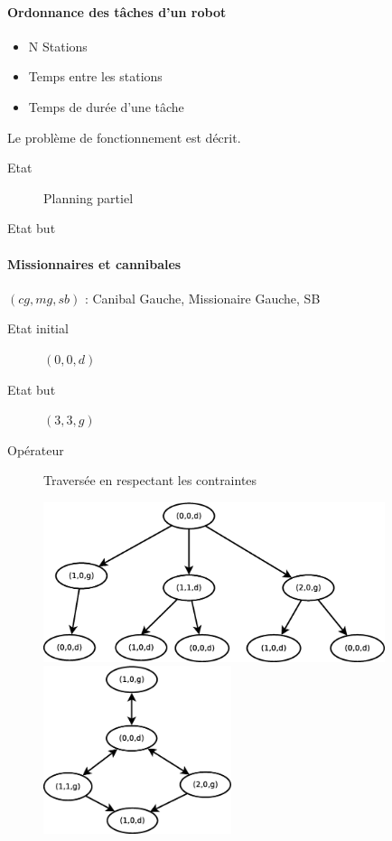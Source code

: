 \documentclass[12pt,a4paper,openany]{book}
\begin{document}
		\begin{exemple}
			\paragraph{Ordonnance des tâches d'un robot}
\begin{itemize}
	\item N Stations
	\item Temps entre les stations
	\item Temps de durée d'une tâche
\end{itemize}
Le problème de fonctionnement est décrit.

\begin{description}
	\item[Etat] Planning partiel
	\item[Etat but] 
\end{description}
\paragraph{Missionnaires et cannibales}
$(cg,mg,sb)$ : Canibal Gauche, Missionaire Gauche, SB
\begin{description}
	\item[Etat initial] $(0,0,d)$ 
	\item[Etat but] $(3,3,g)$
	\item[Opérateur] Traversée en respectant les contraintes 
\end{description}

\begin{figure}[H]
	\centering
	\includegraphics[width=10cm]{Diagramme1.eps}
	\includegraphics[width=5.5cm]{Diagramme2.eps}
\end{figure}
		\end{exemple}
\end{document}
